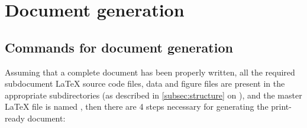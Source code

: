 
\section{Document generation}
\label{sec:documentGeneration}



\subsection{Commands for document generation}
\label{subsec:commandsForDocumentGeneration}

Assuming that a complete document has been properly written, all the required subdocument \LaTeX{} source code files, data and figure
files are present in the appropriate subdirectories (as described in \autoref{subsec:structure} on ),
and the master \LaTeX{} file is named ,
then there are 4 steps necessary for generating the print-ready  document:


